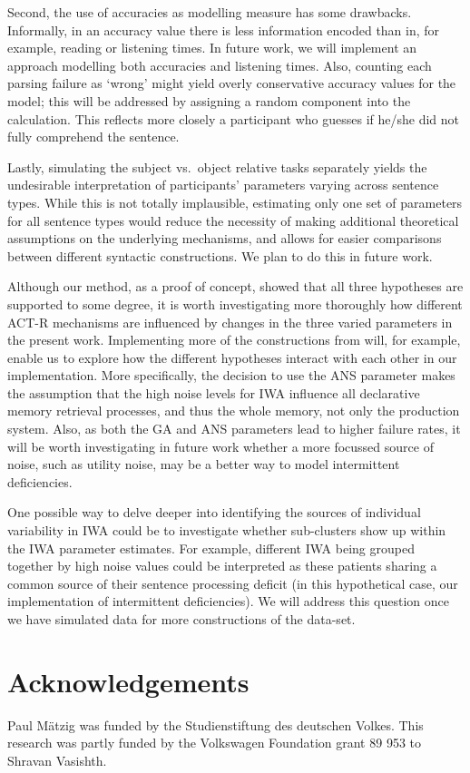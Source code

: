 \documentclass[10pt,letterpaper]{article}
\begin{document}
Second, the use of accuracies as modelling measure has some drawbacks. Informally, in an accuracy value there is less information encoded than in, for example, reading or listening times. In future work, we will implement an approach modelling both accuracies and listening times. Also, counting each parsing failure as `wrong' might yield overly conservative accuracy values for the model; this will be addressed by assigning a random component into the calculation. This reflects more closely a participant who guesses if he/she did not fully comprehend the sentence.

Lastly, simulating the subject vs.\ object relative tasks separately yields the undesirable interpretation of participants' parameters varying across sentence types. While this is not totally implausible, estimating only one set of parameters for all sentence types would reduce the necessity of making additional theoretical assumptions on the underlying mechanisms, and allows for easier comparisons between different syntactic constructions.  We plan to do this in future work.

Although our method, as a proof of concept, showed that all three hypotheses are supported to some degree, it is worth investigating more thoroughly how different ACT-R mechanisms are influenced by changes in the three varied parameters in the present work. Implementing more of the constructions from  will, for example, enable us to explore how the different hypotheses interact with each other in our implementation. 
More specifically, the decision to use the ANS parameter makes the assumption that the high noise levels for IWA influence all declarative memory retrieval processes, and thus the whole memory, not only the production system. Also, as both the GA and ANS parameters lead to higher failure rates, it will be worth investigating in future work whether a more focussed source of noise, such as utility noise, may be a better way to model intermittent deficiencies.

One possible way to delve deeper into identifying the sources of individual variability in IWA could be to investigate whether sub-clusters show up within the IWA parameter estimates.
For example, different IWA being grouped together by high noise values could be interpreted as these patients sharing a common source of their sentence processing deficit (in this hypothetical case, our implementation of intermittent deficiencies). We will address this question once we have simulated data for more constructions of the  data-set.

\section{Acknowledgements}

Paul M\"{a}tzig was funded by the Studienstiftung des deutschen Volkes. 
This research was partly funded by the Volkswagen Foundation grant 89 953 to Shravan Vasishth.



\setlength{\bibleftmargin}{.125in}
\setlength{\bibindent}{-\bibleftmargin}


\end{document}
